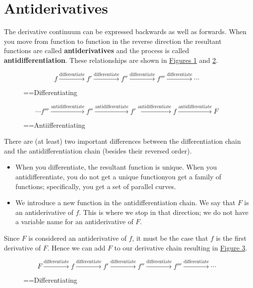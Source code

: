 \documentclass[10pt,oneside,]{book}
\newcommand{\terminology}[1]{\textbf{#1}}
\theoremstyle{plain}
\theoremstyle{definition}
\numberwithin{equation}{section}
\newcommand{\fd}[1]{#1'}
\newcommand{\sd}[1]{#1''}
\newcommand{\td}[1]{#1'''}
\begin{document}
\section[Antiderivatives]{Antiderivatives}\label{section-antiderivatives}
The derivative continuum can be expressed backwards as well as forwards.  When you move from function to function in the reverse direction the resultant functions are called \terminology{antiderivatives} and the process is called \terminology{antidifferentiation}.  These relationships are shown in \hyperref[figure-derivative-chain]{Figures \ref{figure-derivative-chain}} and \hyperref[figure-antiderivative-chain]{\ref{figure-antiderivative-chain}}.%
\begin{figure}
\centering
\[f\xrightarrow{\text{differentiate}}\fd{f}\xrightarrow{\text{differentiate}}\sd{f}\xrightarrow{\text{differentiate}}\td{f}\xrightarrow{\text{differentiate}}\cdots\]%
\caption{\binoppenalty=\maxdimen \relpenalty=\maxdimen Differentiating\label{figure-derivative-chain}}
\end{figure}
\begin{figure}
\centering
\[\cdots\td{f}\xrightarrow{\text{antidifferentiate}}\sd{f}\xrightarrow{\text{antidifferentiate}}\fd{f}\xrightarrow{\text{antidifferentiate}}f\xrightarrow{\text{antidifferentiate}}F\]%
\caption{\binoppenalty=\maxdimen \relpenalty=\maxdimen Antiifferentiating\label{figure-antiderivative-chain}}
\end{figure}
\par
There are (at least) two important differences between the differentiation chain and the antidifferentiation chain (besides their reversed order).%
\begin{itemize}[label=\textbullet]
\item{}When you differentiate, the resultant function is unique. When you antidifferentiate, you do not get a unique function\textemdash{}you get a family of functions; specifically, you get a set of parallel curves.\item{}We introduce a new function in the antidifferentiation chain. We say that \(F\) is an antiderivative of \(f\).  This is where we stop in that direction; we do not have a variable name for an antiderivative of \(F\).\end{itemize}
\par
Since \(F\) is considered an antiderivative of \(f\), it must be the case that \(f\) is the first derivative of \(F\). Hence we can add \(F\) to our derivative chain resulting in \hyperref[figure-longer-derivative-chain]{Figure \ref{figure-longer-derivative-chain}}.%
\begin{figure}
\centering
\[F\xrightarrow{\text{differentiate}}f\xrightarrow{\text{differentiate}}\fd{f}\xrightarrow{\text{differentiate}}\sd{f}\xrightarrow{\text{differentiate}}\td{f}\xrightarrow{\text{differentiate}}\cdots\]%
\caption{\binoppenalty=\maxdimen \relpenalty=\maxdimen Differentiating\label{figure-longer-derivative-chain}}
\end{figure}
\typeout{************************************************}
\typeout{************************************************}
\end{document}
